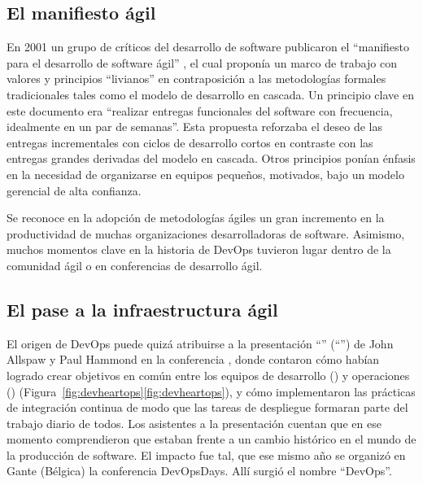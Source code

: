 \subsection{El manifiesto ágil}
%
En 2001 un grupo de críticos del desarrollo de software publicaron el
``manifiesto para el desarrollo de software ágil''
\cite{agilemanifesto}, el cual proponía un marco de trabajo con
valores y principios ``livianos'' en contraposición a las metodologías
formales tradicionales tales como el modelo de desarrollo en
cascada. Un principio clave en este documento era ``realizar entregas
funcionales del software con frecuencia, idealmente en un par de
semanas''. Esta propuesta reforzaba el deseo de las entregas
incrementales con ciclos de desarrollo cortos en contraste con las
entregas grandes derivadas del modelo en cascada. Otros principios
ponían énfasis en la necesidad de organizarse en equipos pequeños,
motivados, bajo un modelo gerencial de alta confianza.

Se reconoce en la adopción de metodologías ágiles un gran incremento
en la productividad de muchas organizaciones desarrolladoras de
software. Asimismo, muchos momentos clave en la historia de DevOps
tuvieron lugar dentro de la comunidad ágil o en conferencias de
desarrollo ágil.
%
\subsection{El pase a la infraestructura ágil}
%
El origen de DevOps puede quizá atribuirse a la presentación ``'' (``'') de John Allspaw y Paul Hammond \cite{flickr} en la
conferencia , donde contaron cómo habían logrado
crear objetivos en común entre los equipos de desarrollo () y
operaciones ()
(\iflatexml{}Figura~\ref{fig:devheartops}\else\autoref{fig:devheartops}\fi),
y cómo implementaron las prácticas de integración continua de modo que
las tareas de despliegue formaran parte del trabajo diario de
todos. Los asistentes a la presentación cuentan que en ese momento
comprendieron que estaban frente a un cambio histórico en el mundo de
la producción de software. El impacto fue tal, que ese mismo año se
organizó en Gante (Bélgica) la conferencia DevOpsDays. Allí surgió el
nombre ``DevOps''.
